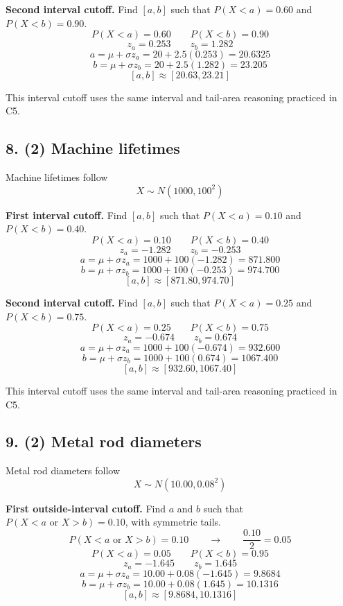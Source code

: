 	\textbf{Second interval cutoff.} Find \([a,b]\) such that \(P(X<a)=0.60\) and \(P(X<b)=0.90\).
	\[
	P(X<a)=0.60
	\qquad
	P(X<b)=0.90
	\]
	\[
	z_a=0.253
	\qquad
	z_b=1.282
	\]
	\[
	a=\mu+\sigma z_a
	=20+2.5(0.253)
	=20.6325
	\]
	\[
	b=\mu+\sigma z_b
	=20+2.5(1.282)
	=23.205
	\]
	\[
	[a,b]\approx[20.63,23.21]
	\]
	
	This interval cutoff uses the same interval and tail-area reasoning practiced in C5.
	
	
	\subsection*{8. (2) Machine lifetimes}
	\label{subsec:inverse-normal-problems-c7-8}
	Machine lifetimes follow
	\[
	X\sim N(1000,100^2)
	\]
	
	\textbf{First interval cutoff.} Find \([a,b]\) such that \(P(X<a)=0.10\) and \(P(X<b)=0.40\).
	\[
	P(X<a)=0.10
	\qquad
	P(X<b)=0.40
	\]
	\[
	z_a=-1.282
	\qquad
	z_b=-0.253
	\]
	\[
	a=\mu+\sigma z_a
	=1000+100(-1.282)
	=871.800
	\]
	\[
	b=\mu+\sigma z_b
	=1000+100(-0.253)
	=974.700
	\]
	\[
	[a,b]\approx[871.80,974.70]
	\]
	
	\textbf{Second interval cutoff.} Find \([a,b]\) such that \(P(X<a)=0.25\) and \(P(X<b)=0.75\).
	\[
	P(X<a)=0.25
	\qquad
	P(X<b)=0.75
	\]
	\[
	z_a=-0.674
	\qquad
	z_b=0.674
	\]
	\[
	a=\mu+\sigma z_a
	=1000+100(-0.674)
	=932.600
	\]
	\[
	b=\mu+\sigma z_b
	=1000+100(0.674)
	=1067.400
	\]
	\[
	[a,b]\approx[932.60,1067.40]
	\]
	
	This interval cutoff uses the same interval and tail-area reasoning practiced in C5.
	
	
	\subsection*{9. (2) Metal rod diameters}
	\label{subsec:inverse-normal-problems-c7-9}
	Metal rod diameters follow
	\[
	X\sim N(10.00,0.08^2)
	\]
	
	\textbf{First outside-interval cutoff.} Find \(a\) and \(b\) such that \(P(X<a\text{ or }X>b)=0.10\), with symmetric tails.
	\[
	P(X<a\text{ or }X>b)=0.10
	\qquad \longrightarrow \qquad
	\frac{0.10}{2}=0.05
	\]
	\[
	P(X<a)=0.05
	\qquad
	P(X<b)=0.95
	\]
	\[
	z_a=-1.645
	\qquad
	z_b=1.645
	\]
	\[
	a=\mu+\sigma z_a
	=10.00+0.08(-1.645)
	=9.8684
	\]
	\[
	b=\mu+\sigma z_b
	=10.00+0.08(1.645)
	=10.1316
	\]
	\[
	[a,b]\approx[9.8684,10.1316]
	\]
	
